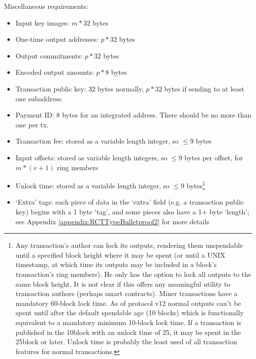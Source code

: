 Miscellaneous requirements:
\begin{itemize}
    \setlength\itemsep{\listspace}
    \item Input key images: $m*32$ bytes
    \item One-time output addresses: $p*32$ bytes
    \item Output commitments: $p*32$ bytes
    \item Encoded output amounts: $p*8$ bytes
    \item Transaction public key: 32 bytes normally, $p*32$ bytes if sending to at least one subaddress.
    \item Payment ID: 8 bytes for an integrated address. There should be no more than one per tx.
    \item Transaction fee: stored as a variable length integer, so $\leq 9$ bytes
    \item Input offsets: stored as variable length integers, so $\leq 9$ bytes per offset, for $m*(v+1)$ ring members
    \item Unlock time: stored as a variable length integer, so $\leq 9$ bytes\footnote{Any transaction's author can lock its outputs, rendering them unspendable until a specified block height where it may be spent (or until a UNIX timestamp, at which time its outputs may be included in a block's transaction's ring members). He only has the option to lock all outputs to the same block height. It is not clear if this offers any meaningful utility to transaction authors (perhaps smart contracts). Miner transactions have a mandatory 60-block lock time. As of protocol v12 normal outputs can't be spent until after the default spendable age (10 blocks) which is functionally equivalent to a mandatory minimum 10-block lock time. If a transaction is published in the 10\nth block with an unlock time of 25, it may be spent in the 25\nth block or later. Unlock time is probably the least used of all transaction features for normal transactions.}
    \item `Extra' tags: each piece of data in the `extra' field (e.g. a transaction public key) begins with a 1 byte `tag', and some pieces also have a 1+ byte `length'; see Appendix \ref{appendix:RCTTypeBulletproof2} for more details
\end{itemize}